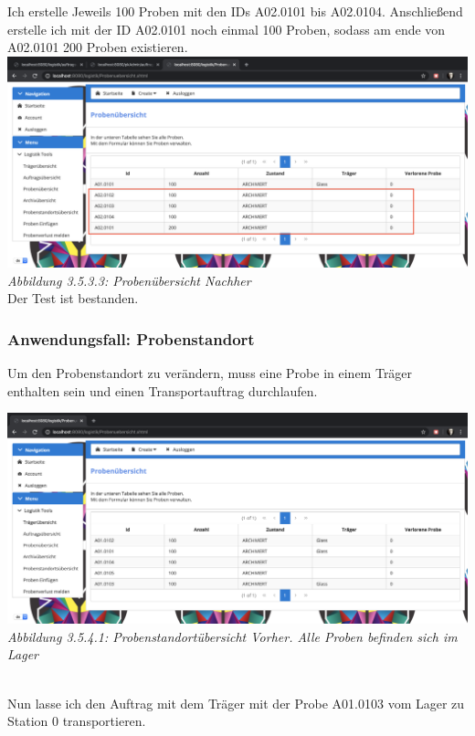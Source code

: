 \documentclass[enabledeprecatedfontcommands,fontsize=12pt,paper=a4,twoside]{scrartcl}
\begin{document}
Ich erstelle Jeweils 100 Proben mit den IDs A02.0101 bis A02.0104.  Anschließend erstelle ich mit der ID A02.0101 noch einmal 100 Proben, sodass am ende von A02.0101 200 Proben existieren.\\

 \hypertarget{sc3.5.3.3}{
\includegraphics[width=1\textwidth]{Screenshots/3533.png}
\textit{Abbildung 3.5.3.3: Probenübersicht Nachher}
} \\

Der Test ist bestanden.


\subsubsection{Anwendungsfall: Probenstandort}

Um den Probenstandort zu verändern, muss eine Probe in einem Träger enthalten sein und einen Transportauftrag durchlaufen. 

 \hypertarget{sc3.5.4.1}{
\includegraphics[width=1\textwidth]{Screenshots/3541.png}
\textit{Abbildung 3.5.4.1: Probenstandortübersicht Vorher. Alle Proben befinden sich im Lager}
} \\

Nun lasse ich den Auftrag mit dem Träger mit der Probe A01.0103 vom Lager zu Station 0 transportieren. 
\end{document}
